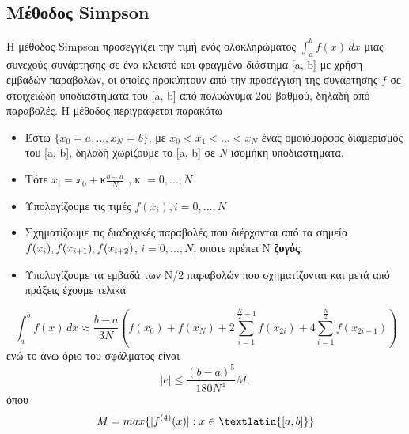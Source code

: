 \documentclass[Second Project.tex]{subfiles}
\begin{document}
\subsection{ Μέθοδος \textlatin{Simpson} }
Η μέθοδος \textlatin{Simpson} προσεγγίζει την τιμή ενός ολοκληρώματος $\int_{a}^{b} f(x) \,dx$ μιας συνεχούς
συνάρτησης σε ένα κλειστό και φραγμένο διάστημα \textlatin{[a, b]} με χρήση εμβαδών παραβολών, οι οποίες 
προκύπτουν από την προσέγγιση της συνάρτησης $f$ σε στοιχειώδη υποδιαστήματα του \textlatin{[a, b]} από
πολυώνυμα 2ου βαθμού, δηλαδή από παραβολές. Η μέθοδος περιγράφεται παρακάτω
\begin{itemize}
    \item Έστω $\{x_{0}=a,\dots,x_{N}=b\}$, με $x_{0}<x_{1}<\dots<x_{N}$ ένας ομοιόμορφος διαμερισμός του
    \textlatin{[a, b]}, δηλαδή χωρίζουμε το \textlatin{[a, b]} σε \textit{Ν} ισομήκη υποδιαστήματα.
    \item Τότε $x_{i} = x_{0} + $κ$\frac{b-a}{N}$ ,  κ $=0,\dots,N$
    \item Υπολογίζουμε τις τιμές $f(x_{i}), i = 0,\dots,N$
    \item Σχηματίζουμε τις διαδοχικές παραβολές που διέρχονται από τα σημεία $f(x_{i}), \\ f(x_{i+1}), f(x_{i+2})$,
    $i = 0,\dots,N$, οπότε πρέπει Ν \textbf{ζυγός}.
    \item Υπολογίζουμε τα εμβαδά των Ν/2 παραβολών που σχηματίζονται και μετά από πράξεις έχουμε τελικά
\end{itemize} 
\begin{equation*}
    \int_{a}^{b} f(x) \,dx \approx \frac{b-a}{3N}(f(x_{0}) + f(x_{N}) + 2\sum_{i=1}^{\frac{N}{2}-1}f(x_{2i}) +
    4\sum_{i=1}^{\frac{N}{2}}f(x_{2i-1}) )
\end{equation*}
ενώ το άνω όριο του σφάλματος είναι
\begin{equation*}
    |e| \leq \frac{(b-a)^{5}}{180N^{4}}M ,
\end{equation*}
όπου
\begin{equation*}
M = max\{|f^{(4)}(x)|: x\in \textlatin{[a, b]}\}
\end{equation*}
\end{document}
